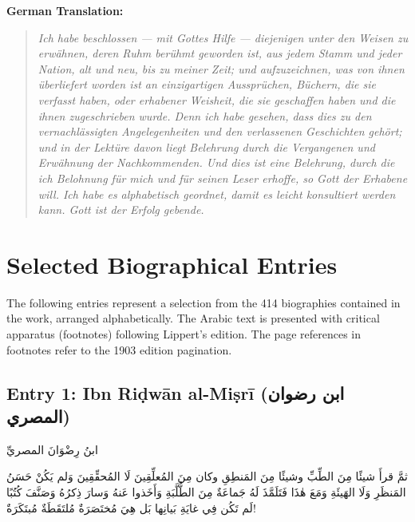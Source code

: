 \documentclass[11pt,a4paper]{article}
\def\RL#1{\beginR#1\endR}
\newcommand{\arabicblock}[1]{{\arabicfont\RL{#1}}}
\newcommand{\textarabic}[1]{{\arabicfont\RL{#1}}}
\begin{document}
\vspace{0.3cm}
\noindent\textbf{German Translation:}

\begin{quote}
\textit{Ich habe beschlossen --- mit Gottes Hilfe --- diejenigen unter den Weisen zu erwähnen, deren Ruhm berühmt geworden ist, aus jedem Stamm und jeder Nation, alt und neu, bis zu meiner Zeit; und aufzuzeichnen, was von ihnen überliefert worden ist an einzigartigen Aussprüchen, Büchern, die sie verfasst haben, oder erhabener Weisheit, die sie geschaffen haben und die ihnen zugeschrieben wurde. Denn ich habe gesehen, dass dies zu den vernachlässigten Angelegenheiten und den verlassenen Geschichten gehört; und in der Lektüre davon liegt Belehrung durch die Vergangenen und Erwähnung der Nachkommenden. Und dies ist eine Belehrung, durch die ich Belohnung für mich und für seinen Leser erhoffe, so Gott der Erhabene will. Ich habe es alphabetisch geordnet, damit es leicht konsultiert werden kann. Gott ist der Erfolg gebende.}
\end{quote}

\newpage

\section{Selected Biographical Entries}
\label{sec:biographies}

The following entries represent a selection from the 414 biographies contained in the work, arranged alphabetically. The Arabic text is presented with critical apparatus (footnotes) following Lippert's edition. The page references in footnotes refer to the 1903 edition pagination.

\subsection{Entry 1: Ibn Riḍwān al-Miṣrī \textarabic{(ابن رضوان المصري)}}

\arabicblock{%
ابنُ رِضْوَانَ المصريِّ

ثمَّ قرأَ شيئًا مِنَ الطِّبِّ وشيئًا مِنَ المَنطِقِ وكان مِنَ المُعلِّقِينَ لَا المُحقِّقِينَ وَلم يَكُنْ حَسَنُ المَنظَرِ وَلَا الهَيئَةِ وَمَعَ هٰذَا فَتَلَمَّذَ لَهُ جَماعَةٌ مِنَ الطُّلَّبَةِ وَأَخَذوا عَنهُ وَسارَ ذِكرُهُ وَصَنَّفَ كُتُبًا لَم تَكُن فِي غايَةِ بَيانِها بَل هِيَ مُختَصَرَةٌ مُلتَقَطَةٌ مُبتَكَرَةٌ!%
}
\end{document}
